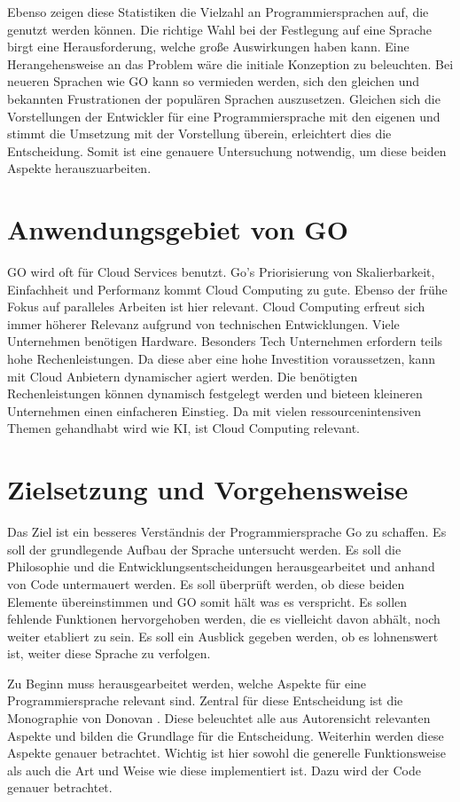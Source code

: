 Ebenso zeigen diese Statistiken die Vielzahl an Programmiersprachen auf, die genutzt werden können. Die richtige Wahl bei der Festlegung auf eine Sprache birgt eine Herausforderung, welche große Auswirkungen haben kann. Eine Herangehensweise an das Problem wäre die initiale Konzeption zu beleuchten. Bei neueren Sprachen wie GO kann so vermieden werden, sich den gleichen und bekannten Frustrationen der populären Sprachen auszusetzen. Gleichen sich die Vorstellungen der Entwickler für eine Programmiersprache mit den eigenen und stimmt die Umsetzung mit der Vorstellung überein, erleichtert dies die Entscheidung. Somit ist eine genauere Untersuchung notwendig, um diese beiden Aspekte herauszuarbeiten. 

\section{Anwendungsgebiet von GO}
GO wird oft für Cloud Services benutzt. Go's Priorisierung von Skalierbarkeit, Einfachheit und Performanz kommt Cloud Computing zu gute. Ebenso der frühe Fokus auf paralleles Arbeiten ist hier relevant. Cloud Computing erfreut sich immer höherer Relevanz aufgrund von technischen Entwicklungen. Viele Unternehmen benötigen Hardware. Besonders Tech Unternehmen erfordern teils hohe Rechenleistungen. Da diese aber eine hohe Investition voraussetzen, kann mit Cloud Anbietern dynamischer agiert werden. Die benötigten Rechenleistungen können dynamisch festgelegt werden und bieteen kleineren Unternehmen einen einfacheren Einstieg. Da mit vielen ressourcenintensiven Themen gehandhabt wird wie KI, ist Cloud Computing relevant. 
\section{Zielsetzung und Vorgehensweise}
Das Ziel ist ein besseres Verständnis der Programmiersprache Go zu schaffen. Es soll der grundlegende Aufbau der Sprache untersucht werden. Es soll die Philosophie und die Entwicklungsentscheidungen herausgearbeitet und anhand von Code untermauert werden. Es soll überprüft werden, ob diese beiden Elemente übereinstimmen und GO somit hält was es verspricht. Es sollen fehlende Funktionen hervorgehoben werden, die es vielleicht davon abhält, noch weiter etabliert zu sein. Es soll ein Ausblick gegeben werden, ob es lohnenswert ist, weiter diese Sprache zu verfolgen.

Zu Beginn muss herausgearbeitet werden, welche Aspekte für eine Programmiersprache relevant sind. Zentral für diese Entscheidung ist die Monographie von Donovan \cite{donovan_go_2016}. Diese beleuchtet alle aus Autorensicht relevanten Aspekte und bilden die Grundlage für die Entscheidung. Weiterhin werden diese Aspekte genauer betrachtet. Wichtig ist hier sowohl die generelle Funktionsweise als auch die Art und Weise wie diese implementiert ist. Dazu wird der Code genauer betrachtet.